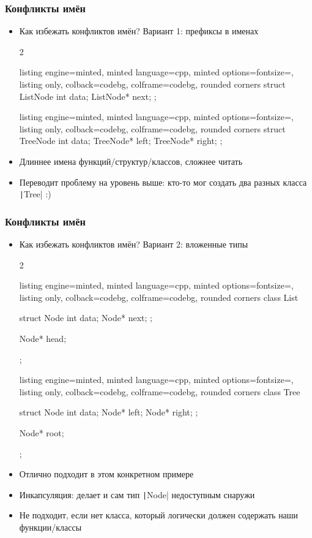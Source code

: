 \documentclass[10pt]{beamer}
\begin{document}
\begin{frame}[fragile]
\frametitle{Конфликты имён}
\begin{itemize}
\item Как избежать конфликтов имён? Вариант 1: префиксы в именах
\begin{multicols}{2}
\begin{tcblisting}{listing engine=minted, minted language=cpp, minted options={fontsize=\scriptsize}, listing only, colback=codebg, colframe=codebg, rounded corners}
struct ListNode {
  int data;
  ListNode* next;
};

\end{tcblisting}
\begin{tcblisting}{listing engine=minted, minted language=cpp, minted options={fontsize=\scriptsize}, listing only, colback=codebg, colframe=codebg, rounded corners}
struct TreeNode {
  int data;
  TreeNode* left;
  TreeNode* right;
};
\end{tcblisting}
\end{multicols}
\pause
{}
\item Длиннее имена функций/структур/классов, сложнее читать
\item Переводит проблему на уровень выше: кто-то мог создать два разных класса \texttt|Tree| :)
\end{itemize}
\end{frame}

\begin{frame}[fragile]
\frametitle{Конфликты имён}
\begin{itemize}
\item Как избежать конфликтов имён? Вариант 2: вложенные типы
\begin{multicols}{2}
\begin{tcblisting}{listing engine=minted, minted language=cpp, minted options={fontsize=\scriptsize}, listing only, colback=codebg, colframe=codebg, rounded corners}
class List {
  struct Node {
    int data;
    Node* next;
  };

  Node* head;
};

\end{tcblisting}
\begin{tcblisting}{listing engine=minted, minted language=cpp, minted options={fontsize=\scriptsize}, listing only, colback=codebg, colframe=codebg, rounded corners}
class Tree {
  struct Node {
    int data;
    Node* left;
    Node* right;
  };

  Node* root;
};
\end{tcblisting}
\end{multicols}
\pause
{}
\item Отлично подходит в этом конкретном примере
\item Инкапсуляция: делает и сам тип \texttt|Node| недоступным снаружи
\item Не подходит, если нет класса, который логически должен содержать наши функции/классы
\end{itemize}
\end{frame}
\end{document}
